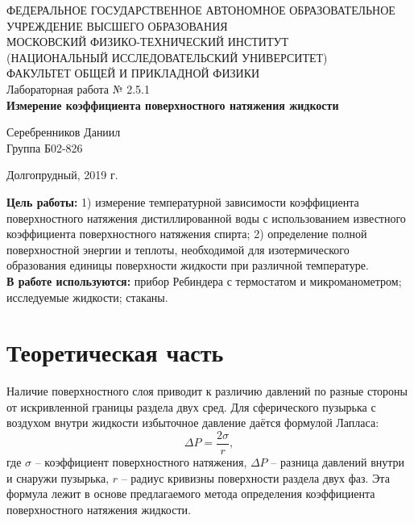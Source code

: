 \documentclass[a4paper,12pt]{article} %
\begin{document}
\begin{center}
	\footnotesize{ФЕДЕРАЛЬНОЕ ГОСУДАРСТВЕННОЕ АВТОНОМНОЕ ОБРАЗОВАТЕЛЬНОЕ 			УЧРЕЖДЕНИЕ ВЫСШЕГО ОБРАЗОВАНИЯ}\\
	\footnotesize{МОСКОВСКИЙ ФИЗИКО-ТЕХНИЧЕСКИЙ ИНСТИТУТ\\(НАЦИОНАЛЬНЫЙ 			ИССЛЕДОВАТЕЛЬСКИЙ УНИВЕРСИТЕТ)}\\
	\footnotesize{ФАКУЛЬТЕТ ОБЩЕЙ И ПРИКЛАДНОЙ ФИЗИКИ\\}
	\hfill \break
	\hfill\break
	\hfill\break
	\hfill \break
	\hfill \break
	\hfill \break
	\hfill \break
	\hfill \break
	\hfill \break
	\hfill \break
	\hfill \break
	\hfill \break
	\hfill \break
	\hfill \break
	\large{Лабораторная работа № 2.5.1\\\textbf{Измерение коэффициента поверхностного натяжения жидкости}}\\
	\hfill \break
	\hfill \break
	\hfill \break
	\begin{flushright}
		Серебренников Даниил\\
		Группа Б02-826
	\end{flushright}
	\hfill \break
	\hfill \break
	\hfill \break
	\hfill \break
	\hfill \break
\end{center}
\hfill \break
\hfill \break
\hfill \break
\hfill \break
\hfill \break
\hfill \break
\begin{center}
	Долгопрудный, 2019 г.
\end{center}
\thispagestyle{empty}
\newpage
	\textbf{Цель работы:} 1) измерение температурной зависимости  коэффициента поверхностного натяжения дистиллированной воды с использованием известного коэффициента поверхностного натяжения спирта; 2) определение полной поверхностной энергии  и теплоты, необходимой для изотермического образования единицы поверхности жидкости  при различной температуре.\\
	\textbf{В работе используются:} прибор  Ребиндера  с термостатом и микроманометром; исследуемые жидкости; стаканы.
\section{Теоретическая часть}
	Наличие поверхностного слоя приводит к различию давлений по разные стороны от искривленной границы раздела двух сред. Для сферического пузырька с воздухом  внутри жидкости избыточное давление даётся формулой Лапласа:
	\begin{equation}
		\label{laplas}
		\Delta P = \frac{2\sigma}{r},
	\end{equation}
	где $\sigma$ – коэффициент поверхностного натяжения, $\Delta P$ – разница давлений внутри и снаружи пузырька, $r$ – радиус кривизны поверхности раздела двух фаз. Эта формула лежит в основе предлагаемого метода определения коэффициента поверхностного натяжения жидкости.
\end{document}
